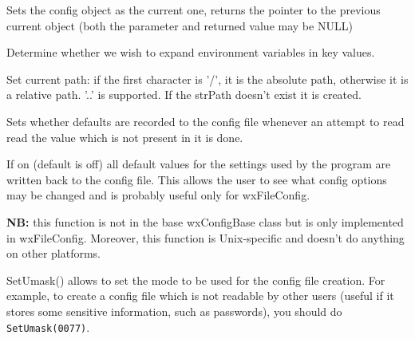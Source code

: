 Sets the config object as the current one, returns the pointer to the previous
current object (both the parameter and returned value may be NULL)

\label{wxconfigbasesetexpandenvvars}


Determine whether we wish to expand environment variables in key values.

\label{wxconfigbasesetpath}


Set current path: if the first character is '/', it is the absolute path,
otherwise it is a relative path. '..' is supported. If the strPath doesn't
exist it is created.

\label{wxconfigbasesetrecorddefaults}


Sets whether defaults are recorded to the config file whenever an attempt to
read read the value which is not present in it is done.

If on (default is off) all default values for the settings used by the program
are written back to the config file. This allows the user to see what config
options may be changed and is probably useful only for wxFileConfig.

\label{wxfileconfigsetumask}


{\bf NB:} this function is not in the base wxConfigBase class but is only
implemented in wxFileConfig. Moreover, this function is Unix-specific and
doesn't do anything on other platforms.

SetUmask() allows to set the mode to be used for the config file creation.
For example, to create a config file which is not readable by other users
(useful if it stores some sensitive information, such as passwords), you
should do {\tt SetUmask(0077)}.

\label{wxconfigbasewrite}



